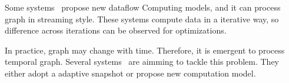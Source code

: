 Some systems~\cite{naiad,differential:dataflow} propose new dataflow Computing
models, and it can process graph in streaming style. These systems compute
data in a iterative way, so difference across iterations can be observed
for optimizations.

In practice, graph may change with time. Therefore, it is emergent to
process temporal graph. Several systems~\cite{vaquero2013xdgp,chronos,kineograph,iyer2016time}
are aimming to tackle this problem.
They either adopt a adaptive snapshot or propose new computation model.
